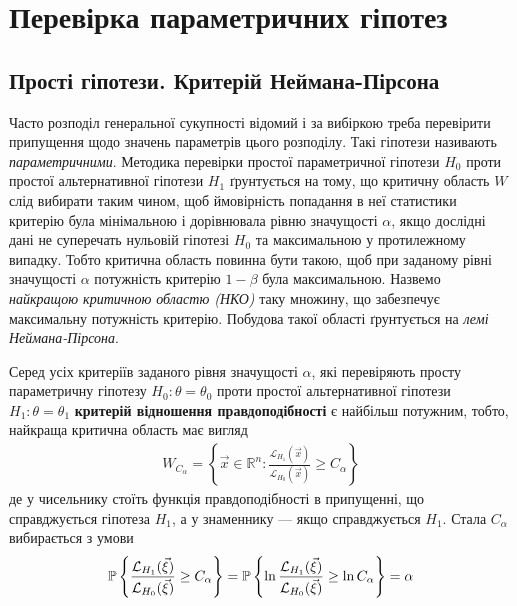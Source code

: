\section{Перевірка параметричних гіпотез}
\subsection{Прості гіпотези. Критерій Неймана-Пірсона}

Часто розподіл генеральної сукупності відомий і за вибіркою треба перевірити 
припущення щодо значень параметрів цього розподілу. Такі гіпотези називають 
\emph{параметричними}. Методика перевірки простої параметричної гіпотези $H_0$
проти простої альтернативної гіпотези $H_1$ ґрунтується на тому, що критичну область $W$
слід вибирати таким чином, щоб ймовірність попадання в неї статистики критерію була мінімальною і 
дорівнювала рівню значущості $\alpha$, якщо дослідні дані не суперечать нульовій гіпотезі $H_0$ та 
максимальною у протилежному випадку. 
Тобто критична область повинна бути такою, щоб при заданому рівні значущості $\alpha$ потужність критерію
$1-\beta$ була максимальною. Назвемо \emph{найкращою критичною областю (НКО)} таку множину, що забезпечує максимальну 
потужність критерію. Побудова такої області ґрунтується на \emph{лемі Неймана-Пірсона}.
\begin{theorem*}
    Серед усіх критеріїв заданого рівня значущості $\alpha$, які 
    перевіряють просту параметричну гіпотезу $H_0 : \theta = \theta_0$ проти простої альтернативної гіпотези 
    $H_1: \theta = \theta_1$ \textbf{критерій відношення правдоподібності} є найбільш потужним, тобто, найкраща критична область
    має вигляд
    \begin{gather}
        W_{C_\alpha} = \left\{
            \vec{x} \in \mathbb{R}^n : \frac{\mathcal{L}_{H_1}(\vec{x})}{\mathcal{L}_{H_0}(\vec{x})} \geq C_{\alpha}
         \right\}
    \end{gather}
    де у чисельнику стоїть функція правдоподібності в припущенні, що справджується 
    гіпотеза $H_1$, а у знаменнику --- якщо справджується $H_1$. Стала $C_{\alpha}$ вибирається з умови
    \begin{gather}
        \P \left\{ \frac{\mathcal{L}_{H_1}(\vec{\xi})}{\mathcal{L}_{H_0}(\vec{\xi})} \geq C_{\alpha}\right\} = 
        \P \left\{ \ln\frac{\mathcal{L}_{H_1}(\vec{\xi})}{\mathcal{L}_{H_0}(\vec{\xi})} \geq \ln C_{\alpha}\right\} = \alpha
    \end{gather}
\end{theorem*}
